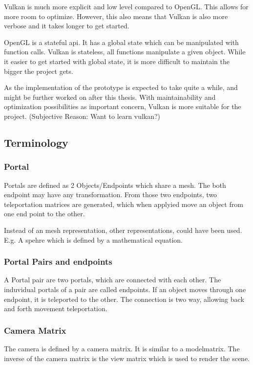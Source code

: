 Vulkan is much more explicit and low level compared to OpenGL. This allows for more room to optimize. However, this also means that Vulkan is also more verbose and it takes longer to get started.

OpenGL is a stateful \gls{api}. It has a global state which can be manipulated with function calls. Vulkan is stateless, all functions manipulate a given object. While it easier to get started with global state, it is more difficult to maintain the bigger the project gets.

As the implementation of the prototype is expected to take quite a while, and might be further worked on after this thesis. With maintainability and optimization possibilities as important concern, Vulkan is more suitable for the project. 
(Subjective Reason: Want to learn vulkan?) 

\subsection{Terminology}

\subsubsection{Portal}
Portals are defined as 2 Objects/Endpoints which share a mesh. The both endpoint may have any transformation. From those two endpoints, two teleportation matrices are generated, which when applyied move an object from one end point to the other.

Instead of an mesh representation, other representations, could have been used. E.g. A spehre which is defined by a mathematical equation.

\subsubsection{Portal Pairs and endpoints}
A Portal pair are two portals, which are connected with each other. The induvidual portals of a pair are called endpoints. If an object moves through one endpoint, it is teleported to the other. The connection is two way, allowing back and forth movement teleportation. 



\subsubsection{Camera Matrix}
The camera is defined by a camera matrix. It is similar to a modelmatrix. The inverse of the camera matrix is the view matrix which is used to render the scene.



